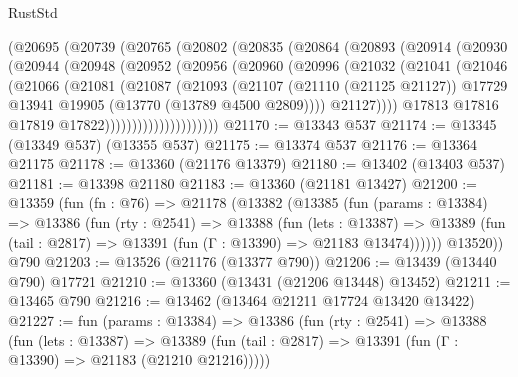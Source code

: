 \begin{lexlean}{RustStd}
\begin{coremodule}
            (@20695
              (@20739
                (@20765
                  (@20802
                    (@20835
                      (@20864
                        (@20893
                          (@20914
                            (@20930
                              (@20944
                                (@20948
                                  (@20952
                                    (@20956
                                      (@20960
                                        (@20996
                                          (@21032
                                            (@21041
                                              (@21046
                                                (@21066
                                                  (@21081
                                                    (@21087
                                                      (@21093
                                                        (@21107
                                                          (@21110 (@21125 @21127))
                                                          @17729
                                                          @13941
                                                          @19905
                                                          (@13770 (@13789 @4500 @2809))))
                                                      @21127))))
                                              @17813
                                              @17816
                                              @17819
                                              @17822)))))))))))))))))))))
@21170 := @13343 @537
@21174 := @13345 (@13349 @537) (@13355 @537)
@21175 := @13374 @537
@21176 := @13364 @21175
@21178 := @13360 (@21176 @13379)
@21180 := @13402 (@13403 @537)
@21181 := @13398 @21180
@21183 := @13360 (@21181 @13427)
@21200 := @13359
    (fun (fn : @76) =>
    @21178
      (@13382
        (@13385
          (fun (params : @13384) =>
          @13386
            (fun (rty : @2541) =>
            @13388
              (fun (lets : @13387) =>
              @13389 (fun (tail : @2817) => @13391 (fun (Γ : @13390) => @21183 @13474))))))
        @13520))
    @790
@21203 := @13526 (@21176 (@13377 @790))
@21206 := @13439 (@13440 @790) @17721
@21210 := @13360 (@13431 (@21206 @13448) @13452)
@21211 := @13465 @790
@21216 := @13462 (@13464 @21211 @17724 @13420 @13422)
@21227 := fun (params : @13384) =>
  @13386
    (fun (rty : @2541) =>
    @13388
      (fun (lets : @13387) =>
      @13389 (fun (tail : @2817) => @13391 (fun (Γ : @13390) => @21183 (@21210 @21216)))))

\end{coremodule}
\end{lexlean}

